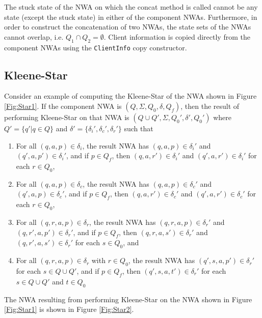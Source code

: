 \documentclass{llncs}
\begin{document}
The stuck state of the NWA on which the concat method is called cannot be any state (except the stuck state) in either of the component NWAs.  Furthermore, in order to construct the concatenation of two NWAs, the state sets of the NWAs cannot overlap, i.e. $Q_1 \cap Q_2 = \emptyset$. Client information is copied directly from the component NWAs using the \texttt{ClientInfo} copy constructor.

\subsection{Kleene-Star}
\label{Se:Star}

Consider an example of computing the Kleene-Star of the NWA shown in Figure \ref{Fig:Star1}.  If the component NWA is $(Q, \Sigma, Q_0, \delta, Q_f)$, then the result of performing Kleene-Star on that NWA is $(Q \cup Q', \Sigma, Q_0', \delta', Q_0')$ where $Q' = \{q' | q \in Q\}$ and $\delta' = \{\delta_i',\delta_c',\delta_r'\}$ such that 

\begin{enumerate} 

\item For all $(q,a,p) \in \delta_i$, the result NWA has $(q,a,p) \in \delta_i'$ and $(q',a,p') \in \delta_i'$, and if $p \in Q_f$, then $(q,a,r') \in \delta_i'$ and $(q',a,r') \in \delta_i'$ for each $r \in Q_0$, 

\item For all $(q,a,p) \in \delta_c$, the result NWA has $(q,a,p) \in \delta_c'$ and $(q',a,p) \in \delta_c'$, and if $p \in Q_f$, then $(q,a,r') \in \delta_c'$ and $(q',a,r') \in \delta_c'$ for each $r \in Q_0$, 

\item For all $(q,r,a,p) \in \delta_r$, the result NWA has $(q,r,a,p) \in \delta_r'$ and $(q,r',a,p') \in \delta_r'$, and if $p \in Q_f$, then $(q,r,a,s') \in \delta_r'$ and $(q,r',a,s') \in \delta_r'$ for each $s \in Q_0$, and 

\item For all $(q,r,a,p) \in \delta_r$ with $r \in Q_0$, the result NWA has $(q',s,a,p') \in \delta_r'$ for each $s \in Q \cup Q'$, and if $p \in Q_f$, then $(q',s,a,t') \in \delta_r'$ for each $s \in Q \cup Q'$ and $t \in Q_0$

\end{enumerate}  

\noindent The NWA resulting from performing Kleene-Star on the NWA shown in Figure \ref{Fig:Star1} is shown in Figure \ref{Fig:Star2}.
\end{document}
